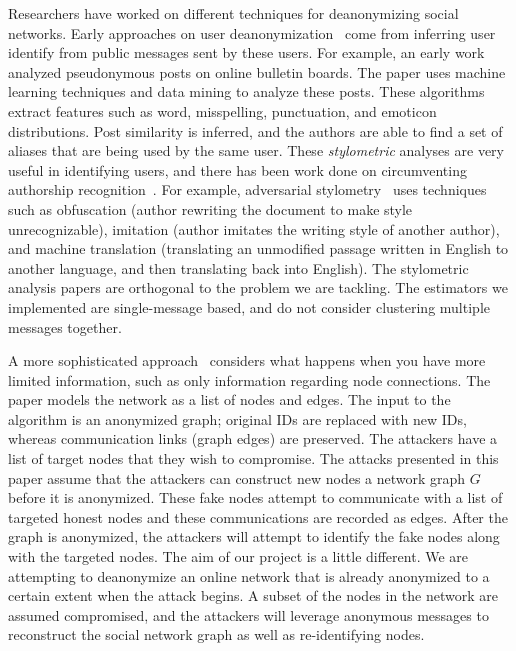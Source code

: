 Researchers have worked on different techniques for deanonymizing social networks. Early approaches on user deanonymization~\cite{novak2004anti,narayanan2006break} come from inferring user identify from public messages sent by these users. For example, an early work~\cite{novak2004anti} analyzed pseudonymous posts on online bulletin boards. The paper uses machine learning techniques and data mining to analyze these posts. These algorithms extract features such as word, misspelling, punctuation, and emoticon distributions. Post similarity is inferred, and the authors are able to find a set of aliases that are being used by the same user. These \emph{stylometric} analyses are very useful in identifying users, and there has been work done on circumventing authorship recognition~\cite{brennan2012adversarial,mcdonald2012use}. For example, adversarial stylometry~\cite{brennan2012adversarial} uses techniques such as obfuscation (author rewriting the document to make style unrecognizable), imitation (author imitates the writing style of another author), and machine translation (translating an unmodified passage written in English to another language, and then translating back into English).
%
The stylometric analysis papers are orthogonal to the problem we are tackling. The estimators we implemented are single-message based, and do not consider clustering multiple messages together.

A more sophisticated approach~\cite{backstrom2007wherefore} considers what happens when you have more limited information, such as only information regarding node connections. The paper models the network as a list of nodes and edges. The input to the algorithm is an anonymized graph; original IDs are replaced with new IDs, whereas communication links (graph edges) are preserved. The attackers have a list of target nodes that they wish to compromise.
The attacks presented in this paper assume that the attackers can construct new nodes a network graph $G$ before it is anonymized. These fake nodes attempt to communicate with a list of targeted honest nodes and these communications are recorded as edges. After the graph is anonymized, the attackers will attempt to identify the fake nodes along with the targeted nodes. 
The aim of our project is a little different. We are attempting to deanonymize an online network that is already anonymized to a certain extent when the attack begins. A subset of the nodes in the network are assumed compromised, and the attackers will leverage anonymous messages to reconstruct the social network graph as well as re-identifying nodes. 

